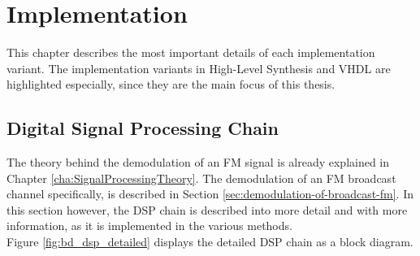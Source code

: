 \chapter{Implementation}
\label{cha:Implementation}

This chapter describes the most important details of each implementation variant.
The implementation variants in High-Level Synthesis and VHDL are highlighted especially, since they are the main focus of this thesis.

\section{Digital Signal Processing Chain}
\label{sec:impl:dsp-chain}

The theory behind the demodulation of an FM signal is already explained in Chapter \ref{cha:SignalProcessingTheory}.
The demodulation of an FM broadcast channel specifically, is described in Section \ref{sec:demodulation-of-broadcast-fm}.
In this section however, the DSP chain is described into more detail and with more information, as it is implemented in the various methods.\\

\noindent
Figure \ref{fig:bd_dsp_detailed} displays the detailed DSP chain as a block diagram.\\


